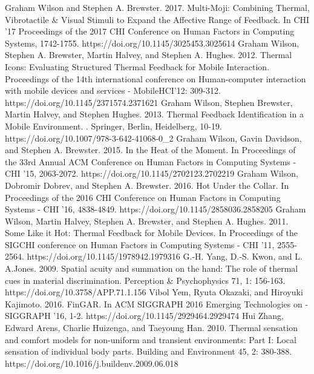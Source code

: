 \documentclass[preprint,12pt]{elsarticle}
\begin{document}
\begin{thebibliography}{00}
Graham Wilson and Stephen A. Brewster. 2017. Multi-Moji: Combining Thermal, Vibrotactile \& Visual Stimuli to Expand the Affective Range of Feedback. In CHI '17 Proceedings of the 2017 CHI Conference on Human Factors in Computing Systems, 1742-1755. https://doi.org/10.1145/3025453.3025614
Graham Wilson, Stephen A. Brewster, Martin Halvey, and Stephen A. Hughes. 2012. Thermal Icons: Evaluating Structured Thermal Feedback for Mobile Interaction. Proceedings of the 14th international conference on Human-computer interaction with mobile devices and services - MobileHCI'12: 309-312. https://doi.org/10.1145/2371574.2371621
Graham Wilson, Stephen Brewster, Martin Halvey, and Stephen Hughes. 2013. Thermal Feedback Identification in a Mobile Environment. . Springer, Berlin, Heidelberg, 10-19. https://doi.org/10.1007/978-3-642-41068-0\_2
Graham Wilson, Gavin Davidson, and Stephen A. Brewster. 2015. In the Heat of the Moment. In Proceedings of the 33rd Annual ACM Conference on Human Factors in Computing Systems - CHI '15, 2063-2072. https://doi.org/10.1145/2702123.2702219
Graham Wilson, Dobromir Dobrev, and Stephen A. Brewster. 2016. Hot Under the Collar. In Proceedings of the 2016 CHI Conference on Human Factors in Computing Systems - CHI '16, 4838-4849. https://doi.org/10.1145/2858036.2858205
Graham Wilson, Martin Halvey, Stephen A. Brewster, and Stephen A. Hughes. 2011. Some Like it Hot: Thermal Feedback for Mobile Devices. In Proceedings of the SIGCHI conference on Human Factors in Computing Systems - CHI '11, 2555-2564. https://doi.org/10.1145/1978942.1979316
G.-H. Yang, D.-S. Kwon, and L. A.Jones. 2009. Spatial acuity and summation on the hand: The role of thermal cues in material discrimination. Perception \& Psychophysics 71, 1: 156-163. https://doi.org/10.3758/APP.71.1.156
Vibol Yem, Ryuta Okazaki, and Hiroyuki Kajimoto. 2016. FinGAR. In ACM SIGGRAPH 2016 Emerging Technologies on - SIGGRAPH '16, 1-2. https://doi.org/10.1145/2929464.2929474
Hui Zhang, Edward Arens, Charlie Huizenga, and Taeyoung Han. 2010. Thermal sensation and comfort models for non-uniform and transient environments: Part I: Local sensation of individual body parts. Building and Environment 45, 2: 380-388. https://doi.org/10.1016/j.buildenv.2009.06.018


\end{thebibliography}
\end{document}
